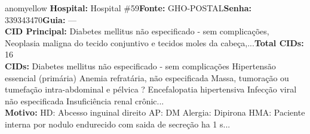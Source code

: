 \documentclass[a4paper,10pt]{article}
\begin{document}
\begin{anomalycard}[Interna\c{c}\~{a}o \#11217 | Pac. \#11832 | MODERADO (z=2.37) | LOS: 9d | 21/02/2026\,$\to$\,02/03/2026]{anomyellow}
\textbf{Hospital:} Hospital \#59\quad \textbf{Fonte:} GHO-POSTAL\quad \textbf{Senha:} 339343470\quad \textbf{Guia:} ---\\

\textbf{CID Principal:} {\small Diabetes mellitus não especificado - sem complicações, Neoplasia maligna do tecido conjuntivo e tecidos moles da cabeça,...}\quad\textbf{Total CIDs:} 16\\

\textbf{CIDs:} {\scriptsize Diabetes mellitus não especificado - sem complicações \textbar{} Hipertensão essencial (primária) \textbar{} Anemia refratária, não especificada \textbar{} Massa, tumoração ou tumefação intra-abdominal e pélvica \textbar{} ? \textbar{} Encefalopatia hipertensiva \textbar{} Infecção viral não especificada \textbar{} Insuficiência renal crônic...}\\

\textbf{Motivo:} {\scriptsize HD: Abcesso inguinal direito AP: DM  Alergia: Dipirona HMA: Paciente interna por nodulo endurecido com saida de secreção ha 1 s...}\\




\end{anomalycard}
\end{document}
